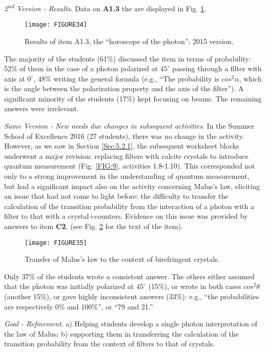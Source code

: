 \documentclass[twocolumn,secnumarabic,amssymb, nobibnotes, aps, prd, nofootinbib]{revtex4-2}
\begin{document}
\emph{2\textsuperscript{nd} Version - Results}. Data on \textbf{A1.3} the are displayed in Fig. \ref{FIG:34}.
\begin{figure}[!htpb]
       \texttt{[image: FIGURE34]}
    \caption{Results of item A1.3, the ``horoscope of the photon'': 2015 version.}
    \label{FIG:34}
\end{figure}
The majority of the students (61\%) discussed the item in terms of probability: 52\% of them in the case of a photon polarized at $45^{\circ}$ passing through a filter with axis at $0^{\circ}$, 48\% writing the general formula (e.g., ``The probability is $cos^2\alpha$, which is the angle between the polarization property and the axis of the filter''). A significant minority of the students (17\%) kept focusing on beams. The remaining answers were irrelevant.

\emph{{Same Version - New needs due changes in subsequent activities}}. In the Summer School of Excellence 2016 (27 students), there was no change in the activity. However, as we saw in Section \ref{Sec:5.2.1}, the subsequent worksheet blocks underwent a major revision: replacing filters with calcite crystals to introduce quantum measurement (Fig. \ref{FIG:9}, activities 1.8-1.10).  This corresponded not only to a strong improvement in the understanding of quantum measurement, but had a significant impact also on the activity concerning Malus's law, eliciting an issue that had not come to light before: the difficulty to transfer the calculation of the transition probability from the interaction of a photon with a filter to that with a crystal$+$counters. Evidence on this issue was provided by answers to item \textbf{C2}, (see Fig. \ref{FIG:35} for the text of the item).
\begin{figure}[!htpb]
    \texttt{[image: FIGURE35]}
    \caption{Transfer of Malus's law to the context of birefringent crystals.}
    \label{FIG:35}
\end{figure}
Only 37\% of the students wrote a consistent answer. The others either assumed that the photon was initially polarized at $45^{\circ}$ (15\%), or wrote in both cases $cos^2 \theta$ (another 15\%), or gave highly inconsistent answers (33\%): e.g., ``the probabilities are respectively 0\% and 100\%'', or ``79 and 21.''

\emph{Goal - Refinement}. a) Helping students develop a single photon interpretation of the law of Malus; b) supporting them in transferring the calculation of the transition probability from the context of filters to that of crystals.
\end{document}
